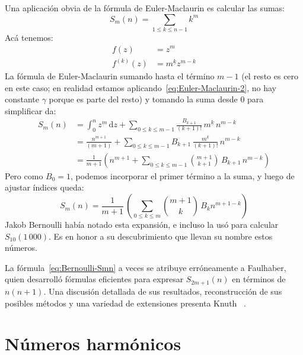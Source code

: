   Una aplicación obvia de la fórmula de Euler-Maclaurin%
  es calcular las sumas:
  \begin{equation*}
    S_m(n)
      = \sum_{1 \le k \le n - 1} k^m
  \end{equation*}
  Acá tenemos:
  \begin{align*}
    f(z)
      &= z^m \\
    f^{(k)}(z)
      &= m^{\underline{k}} z^{m - k}
  \end{align*}
  La fórmula de Euler-Maclaurin sumando hasta el término \(m - 1\)
  (el resto es cero en este caso;
   en realidad estamos aplicando~\eqref{eq:Euler-Maclaurin-2},
   no hay constante \(\gamma\) porque es parte del resto)
  y tomando la suma desde \(0\) para simplificar
  da:
  \begin{align*}
    S_m(n)
      &= \int_0^n z^m \, \mathrm{d} z
	   + \sum_{0 \le k \le m - 1}
	       \frac{B_{k + 1}}{(k + 1)!} \,
		 m^{\underline{k}} \, n^{m - k} \\
      &= \frac{n^{m + 1}}{(m + 1)}
	   + \sum_{0 \le k \le m - 1}
	       B_{k + 1} \,
		  \frac{m^{\underline{k}}}{(k + 1)!} \,
		  n^{m - k} \\
      &= \frac{1}{m + 1}
	   \left(
	     n^{m + 1}
	       + \sum_{0 \le k \le m - 1} \binom{m + 1}{k + 1} \,
		   B_{k + 1} \, n^{m - k}
	   \right)
  \end{align*}
  Pero como \(B_0 = 1\),
  podemos incorporar el primer término a la suma,
  y luego de ajustar índices queda:%
  \begin{equation}
    \label{eq:Bernoulli-Smn}
    S_m(n)
      = \frac{1}{m + 1} \,
	  \left(
	    \sum_{0 \le k \le m}
	      \binom{m + 1}{k} \, B_k n^{m + 1 - k}
	  \right)
  \end{equation}
  Jakob Bernoulli%
  había notado esta expansión,
  e incluso la usó para calcular \(S_{10}(1\,000)\).
  Es en honor a su descubrimiento
  que llevan su nombre estos números.

  La fórmula~\eqref{eq:Bernoulli-Smn}
  a veces se atribuye erróneamente a Faulhaber,%
  quien desarrolló fórmulas eficientes
  para expresar \(S_{2 m + 1}(n)\)
  en términos de \(n (n + 1)\).
  Una discusión detallada de sus resultados,
  reconstrucción de sus posibles métodos
  y una variedad de extensiones presenta Knuth~%
    \cite{knuth93:_johann_faulhaber_sums_powers}.

\section{Números harmónicos}
\label{sec:em-harmonicos}

